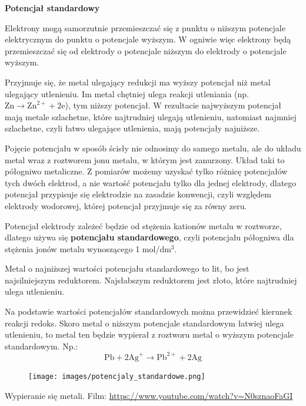 \documentclass{article}
\begin{document}
\textbf{Potencjał standardowy}

Elektrony mogą samorzutnie przemieszczać się z punktu o niższym potencjale elektrycznym do punktu o potencjale wyższym. W ogniwie więc elektrony będą przemieszczać się od elektrody o potencjale niższym do elektrody o potencjale wyższym. 

Przyjmuje się, że metal ulegający redukcji ma wyższy potencjał niż metal ulegający utlenieniu. Im metal chętniej ulega reakcji utleniania (np. $\text{Zn}\rightarrow \text{Zn}^{2+}+2\text{e}$), tym niższy potencjał. W rezultacie najwyższym potencjał mają metale szlachetne, które najtrudniej ulegają utlenieniu, natomiast najmniej szlachetne, czyli łatwo ulegające utlenienia, mają potencjały najniższe. 

Pojęcie potencjału w sposób ścisły nie odnosimy do samego metalu, ale do układu metal wraz z roztworem jonu metalu, w którym jest zanurzony. Układ taki to półogniwo metaliczne. Z pomiarów możemy uzyskać tylko różnicę potencjałów tych dwóch elektrod, a nie wartość potencjału tylko dla jednej elektrody, dlatego potencjał przypisuje się elektrodzie na zasadzie konwencji, czyli względem elektrody wodorowej, której potencjał przyjmuje się za równy zeru.

Potencjał elektrody zależeć będzie od stężenia kationów metalu w roztworze, dlatego używa się \textbf{potencjału standardowego}, czyli potencjału półogniwa dla stężenia jonów metalu wynoszącego 1 mol/dm$^3$.

Metal o najniższej wartości potencjału standardowego to lit, bo jest najsilniejszym reduktorem. Najsłabszym reduktorem jest złoto, które najtrudniej ulega utlenieniu.

Na podstawie wartości potencjałów standardowych można przewidzieć kierunek reakcji redoks. Skoro metal o niższym potencjale standardowym łatwiej ulega utlenieniu, to metal ten będzie wypierał z roztworu metal o wyższym potencjale standardowym. Np.:
\begin{equation*}
    \text{Pb}+2\text{Ag}^+\rightarrow\text{Pb}^{2+}+2\text{Ag}
\end{equation*}

\begin{figure}[H]
    \centering
    \texttt{[image: images/potencjaly\_standardowe.png]}
\end{figure}

Wypieranie się metali. Film: \url{https://www.youtube.com/watch?v=N0sznaoFaGI}
\end{document}
